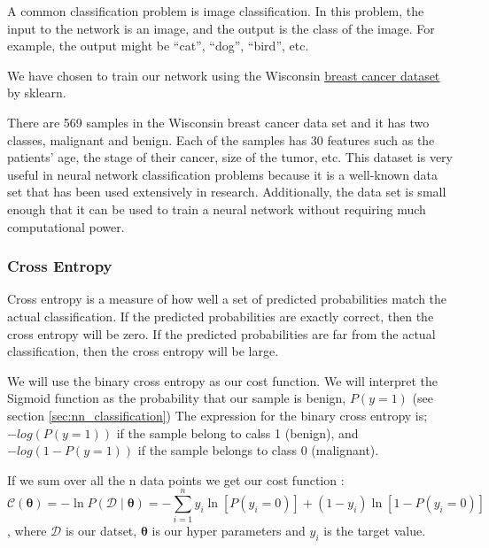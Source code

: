 A common classification problem is image classification. In
this problem, the input to the network is an image, and the output is the class
of the image. For example, the output might be “cat”, “dog”, “bird”, etc.

We have chosen to train our network using the Wisconsin 
\href{https://scikit-learn.org/stable/modules/generated/sklearn.datasets.load\_breast\_cancer.html?fbclid=IwAR0RNzOImikVXi41ecb14u\_qvUDybyIII43e9ySk0GEjyYWyPzybmmHeQWs}{\underline{breast
cancer dataset}} by sklearn.

There are 569 samples in the Wisconsin breast cancer data set and it has two
classes, malignant and benign. Each of the samples has 30 features such as the
patients’ age, the stage of their cancer, size of the tumor, etc. This dataset
is very useful in neural network classification problems because it is a well-known
data set that has been used extensively in research. Additionally, the data set
is small enough that it can be used to train a neural network without requiring
much computational power.



\subsubsection{Cross Entropy}
Cross entropy is a measure of how well a set of predicted probabilities match
the actual classification. If the predicted probabilities are exactly correct,
then the cross entropy will be zero. If the predicted probabilities are far
from the actual classification, then the cross entropy will be large.

We will use the binary cross entropy as our cost function. 
We will interpret the Sigmoid function as the probability that our sample
is benign, $P(y=1)$ (see section \ref{sec:nn_classification})
The expression for the binary cross entropy is; $-log(P(y=1))$ if the sample
belong to calss 1 (benign), 
and $-log(1-P(y=1))$ if the sample belongs to class 0 (malignant). 

If we sum over all the n data points we get our cost function \cite{w41}: 
\begin{equation*}
    \label{eq:cross_entropy} 
\mathcal{C}(\boldsymbol{\theta}) = - \ln P(\mathcal{D} \mid \boldsymbol{\theta}) = - \sum_{i=1}^n
y_i \ln[P(y_i = 0)] + (1 - y_i) \ln [1 - P(y_i = 0)] 
\end{equation*}
, where $\mathcal{D}$ is our datset, $\bm{\theta }$ is our hyper parameters and $y_i$
is the target value. 


